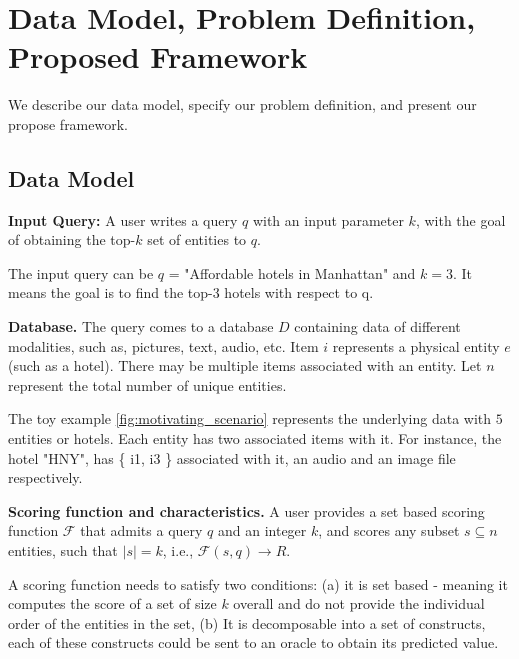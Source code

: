 \section{Data Model, Problem Definition, Proposed Framework}
We describe our data model, specify our problem definition, and present our propose framework.

\subsection{Data Model}
\textbf{Input Query:} A user writes a query $q$ with an input parameter $k$, with the goal of obtaining the top-$k$ set of entities to $q$.

\begin{example}
    The input query can be $q$ = "Affordable hotels in Manhattan" and $k = 3$. It means the goal is to find the top-3 hotels with respect to q.  
\end{example}

\textbf{Database.} The query comes to a database $D$ containing data of different modalities, such as, pictures, text, audio, etc. Item $i$ represents a physical entity $e$ (such as a hotel). There may be multiple items associated with an entity. Let $n$ represent the total number of unique entities.

The toy example \autoref{fig:motivating_scenario} represents the underlying data with $5$ entities or hotels. Each entity has two associated items with it. For instance, the  hotel "HNY", has \{ i1, i3 \} associated with it, an audio and an image file respectively.

\textbf{Scoring function and characteristics.} A user provides a set based scoring function $\mathcal{F}$ that admits a query  $q$ and an integer $k$, and scores any subset $s \subseteq n$ entities, such that $|s|=k$, i.e., $\mathcal{F}(s,q) \rightarrow R$. 

A scoring function needs to satisfy two conditions: (a) it is set based - meaning it computes the score of a set of size $k$ overall and do not provide the individual order of the entities in the set, (b) It is decomposable into a set of constructs, each of these constructs could be sent to an oracle to obtain its predicted value.

